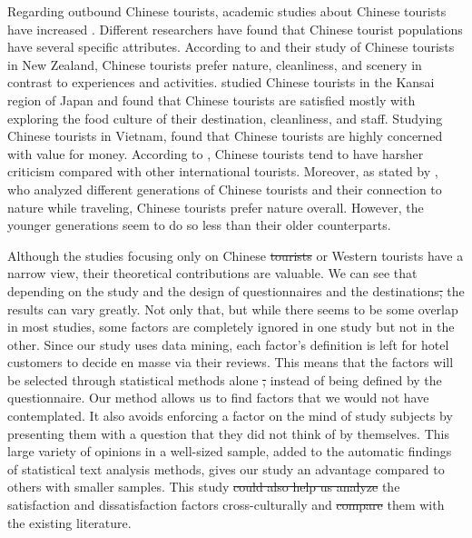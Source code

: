 \documentclass[smallextended,natbib]{svjour3}       %
\providecommand{\DIFadd}[1]{{\protect\color{blue}\uwave{#1}}} %
\providecommand{\DIFdel}[1]{{\protect\color{red}\sout{#1}}}                      %
\providecommand{\DIFaddbegin}{} %
\providecommand{\DIFaddend}{} %
\providecommand{\DIFdelbegin}{} %
\providecommand{\DIFdelend}{} %
\newcommand{\DIFscaledelfig}{0.5}
\newlength{\DIFdelgraphicswidth} %
\newlength{\DIFdelgraphicsheight} %
\newcommand{\DIFaddincludegraphics}[2][]{{\color{blue}\fbox{\DIFOincludegraphics[#1]{#2}}}} %
\newcommand{\DIFdelincludegraphics}[2][]{%
\sbox{\DIFdelgraphicsbox}{\DIFOincludegraphics[#1]{#2}}%
\settoboxwidth{\DIFdelgraphicswidth}{\DIFdelgraphicsbox} %
\settoboxtotalheight{\DIFdelgraphicsheight}{\DIFdelgraphicsbox} %
\scalebox{\DIFscaledelfig}{%
\parbox[b]{\DIFdelgraphicswidth}{\usebox{\DIFdelgraphicsbox}\\[-\baselineskip] \rule{\DIFdelgraphicswidth}{0em}}\llap{\resizebox{\DIFdelgraphicswidth}{\DIFdelgraphicsheight}{%
\setlength{\unitlength}{\DIFdelgraphicswidth}%
\begin{picture}(1,1)%
\thicklines\linethickness{2pt} %
{\color[rgb]{1,0,0}\put(0,0){\framebox(1,1){}}}%
{\color[rgb]{1,0,0}\put(0,0){\line( 1,1){1}}}%
{\color[rgb]{1,0,0}\put(0,1){\line(1,-1){1}}}%
\end{picture}%
}\hspace*{3pt}}} %
} %
\DeclareRobustCommand{\DIFaddbegin}{\DIFOaddbegin \let\includegraphics\DIFaddincludegraphics} %
\DeclareRobustCommand{\DIFaddend}{\DIFOaddend \let\includegraphics\DIFOincludegraphics} %
\DeclareRobustCommand{\DIFdelbegin}{\DIFOdelbegin \let\includegraphics\DIFdelincludegraphics} %
\DeclareRobustCommand{\DIFdelend}{\DIFOaddend \let\includegraphics\DIFOincludegraphics} %
\begin{document}
    Regarding outbound Chinese tourists, academic studies about Chinese tourists have increased \cite[][]{sun2017}. Different researchers have found that Chinese tourist populations have several specific attributes. According to \cite{ryan2001} and their study of Chinese tourists in New Zealand, Chinese tourists prefer nature, cleanliness, and scenery in contrast to experiences and activities. \cite{dongyang2015} studied Chinese tourists in the Kansai region of Japan and found that Chinese tourists are satisfied mostly with exploring the food culture of their destination, cleanliness, and staff. Studying Chinese tourists in Vietnam, \cite{truong2009} found that Chinese tourists are highly concerned with value for money. According to \cite{liu2019}, Chinese tourists tend to have harsher criticism compared with other international tourists. Moreover, as stated by \cite{gao2017chinese}, who analyzed different generations of Chinese tourists and their connection to nature while traveling, Chinese tourists prefer nature overall. However, the younger generations seem to do so less than their older counterparts. 

    Although the studies focusing only on Chinese \DIFdelbegin \DIFdel{tourists }\DIFdelend or Western tourists have a narrow view, their theoretical contributions are valuable. We can see that depending on the study and the design of questionnaires and the destinations\DIFdelbegin \DIFdel{, }\DIFdelend \DIFaddbegin \DIFadd{; }\DIFaddend the results can vary greatly. Not only that, but while there seems to be some overlap in most studies, some factors are completely ignored in one study but not in the other. Since our study uses data mining, each factor's definition is left for hotel customers to decide en masse via their reviews. This means that the factors will be selected through statistical methods alone \DIFdelbegin \DIFdel{, }\DIFdelend instead of being defined by the questionnaire. Our method allows us to find factors that we would not have contemplated. It also avoids enforcing a factor on the mind of study subjects by presenting them with a question that they did not think of by themselves. This large variety of opinions in a well-sized sample, added to the automatic findings of statistical text analysis methods, gives our study an advantage compared to others with smaller samples. This study \DIFdelbegin \DIFdel{could also help us analyze }\DIFdelend \DIFaddbegin \DIFadd{analyzes }\DIFaddend the satisfaction and dissatisfaction factors cross-culturally and \DIFdelbegin \DIFdel{compare }\DIFdelend \DIFaddbegin \DIFadd{compares }\DIFaddend them with the existing literature.
\end{document}
